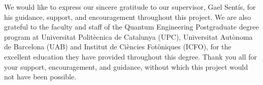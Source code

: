 We would like to express our sincere gratitude to our supervisor, Gael Sent\'is, for his guidance, support, and encouragement throughout this project. We are also grateful to the faculty and staff of the Quantum Engineering Postgraduate degree program at Universitat Polit\`ecnica de Catalunya (UPC), Universitat Aut\`onoma de Barcelona (UAB) and Institut de Ci\`encies Fot\`oniques (ICFO), for the excellent education they have provided throughout this degree. Thank you all for your support, encouragement, and guidance, without which this project would not have been possible.